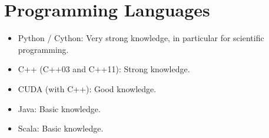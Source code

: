 \documentclass[a4paper,11pt]{article}
\begin{document}
\section{Programming Languages}
\begin{itemize}
    \item Python / Cython: Very strong knowledge, in particular for scientific programming.
    \item C++ (C++03 and C++11): Strong knowledge.
    \item CUDA (with C++): Good knowledge.
    \item Java: Basic knowledge.
    \item Scala: Basic knowledge.
\end{itemize}

\begin{publications}
\end{publications}
\end{document}
